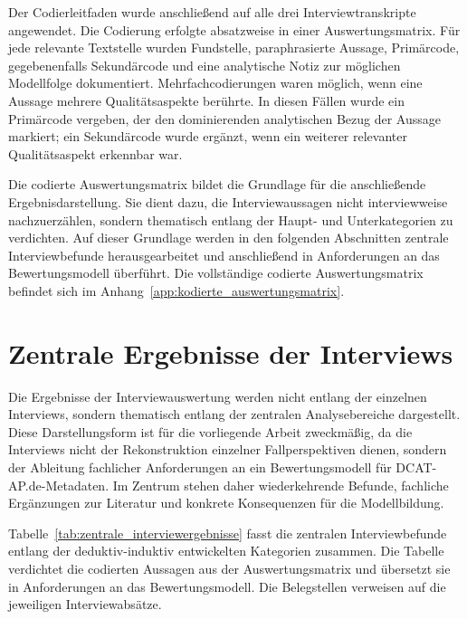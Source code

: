 Der Codierleitfaden wurde anschließend auf alle drei Interviewtranskripte angewendet. Die Codierung erfolgte absatzweise in einer Auswertungsmatrix. Für jede relevante Textstelle wurden Fundstelle, paraphrasierte Aussage, Primärcode, gegebenenfalls Sekundärcode und eine analytische Notiz zur möglichen Modellfolge dokumentiert. Mehrfachcodierungen waren möglich, wenn eine Aussage mehrere Qualitätsaspekte berührte. In diesen Fällen wurde ein Primärcode vergeben, der den dominierenden analytischen Bezug der Aussage markiert; ein Sekundärcode wurde ergänzt, wenn ein weiterer relevanter Qualitätsaspekt erkennbar war.

Die codierte Auswertungsmatrix bildet die Grundlage für die anschließende Ergebnisdarstellung. Sie dient dazu, die Interviewaussagen nicht interviewweise nachzuerzählen, sondern thematisch entlang der Haupt- und Unterkategorien zu verdichten. Auf dieser Grundlage werden in den folgenden Abschnitten zentrale Interviewbefunde herausgearbeitet und anschließend in Anforderungen an das Bewertungsmodell überführt. Die vollständige codierte Auswertungsmatrix befindet sich im Anhang~\ref{app:kodierte_auswertungsmatrix}.

\section{Zentrale Ergebnisse der Interviews}
\label{sec:interview_ergebnisse}

Die Ergebnisse der Interviewauswertung werden nicht entlang der einzelnen Interviews, sondern thematisch entlang der zentralen Analysebereiche dargestellt. Diese Darstellungsform ist für die vorliegende Arbeit zweckmäßig, da die Interviews nicht der Rekonstruktion einzelner Fallperspektiven dienen, sondern der Ableitung fachlicher Anforderungen an ein Bewertungsmodell für DCAT-AP.de-Metadaten. Im Zentrum stehen daher wiederkehrende Befunde, fachliche Ergänzungen zur Literatur und konkrete Konsequenzen für die Modellbildung.

Tabelle~\ref{tab:zentrale_interviewergebnisse} fasst die zentralen Interviewbefunde entlang der deduktiv-induktiv entwickelten Kategorien zusammen. Die Tabelle verdichtet die codierten Aussagen aus der Auswertungsmatrix und übersetzt sie in Anforderungen an das Bewertungsmodell. Die Belegstellen verweisen auf die jeweiligen Interviewabsätze.

